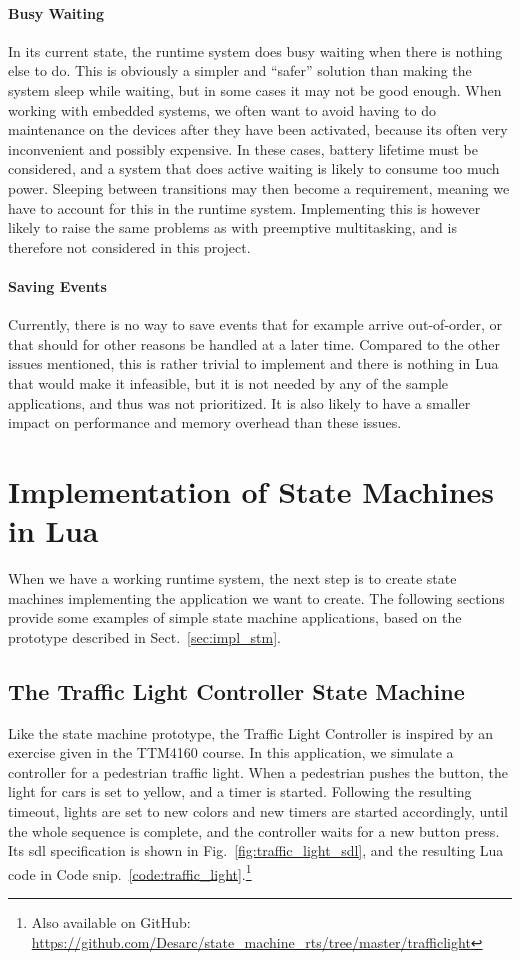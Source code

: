 \paragraph{Busy Waiting} In its current state, the runtime system does busy waiting when there is nothing else to do. This is obviously a simpler and ``safer'' solution than making the system sleep while waiting, but in some cases it may not be good enough. When working with embedded systems, we often want to avoid having to do maintenance on the devices after they have been activated, because its often very inconvenient and possibly expensive. In these cases, battery lifetime must be considered, and a system that does active waiting is likely to consume too much power. Sleeping between transitions may then become a requirement, meaning we have to account for this in the runtime system. Implementing this is however likely to raise the same problems as with preemptive multitasking, and is therefore not considered in this project.

\paragraph{Saving Events} Currently, there is no way to save events that for example arrive out-of-order, or that should for other reasons be handled at a later time. Compared to the other issues mentioned, this is rather trivial to implement and there is nothing in Lua that would make it infeasible, but it is not needed by any of the sample applications, and thus was not prioritized. It is also likely to have a smaller impact on performance and memory overhead than these issues.

\section{Implementation of State Machines in Lua}
\label{sec:impl_state_machines}
When we have a working runtime system, the next step is to create state machines implementing the application we want to create. The following sections provide some examples of simple state machine applications, based on the prototype described in Sect.~\ref{sec:impl_stm}.

\subsection{The Traffic Light Controller State Machine}
\label{sec:impl_traffic_light}
Like the state machine prototype, the Traffic Light Controller is inspired by an exercise given in the TTM4160 course. In this application, we simulate a controller for a pedestrian traffic light. When a pedestrian pushes the button, the light for cars is set to yellow, and a timer is started. Following the resulting timeout, lights are set to new colors and new timers are started accordingly, until the whole sequence is complete, and the controller waits for a new button press. Its \gls{sdl} specification is shown in Fig.~\ref{fig:traffic_light_sdl}, and the resulting Lua code in Code snip.~\ref{code:traffic_light}.\footnote{Also available on GitHub: \url{https://github.com/Desarc/state_machine_rts/tree/master/trafficlight}}

